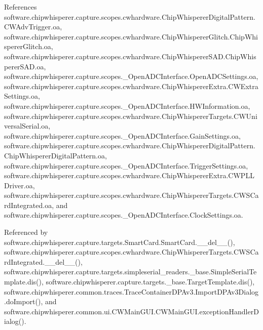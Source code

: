 References software.\+chipwhisperer.\+capture.\+scopes.\+cwhardware.\+Chip\+Whisperer\+Digital\+Pattern.\+C\+W\+Adv\+Trigger.\+oa, software.\+chipwhisperer.\+capture.\+scopes.\+cwhardware.\+Chip\+Whisperer\+Glitch.\+Chip\+Whisperer\+Glitch.\+oa, software.\+chipwhisperer.\+capture.\+scopes.\+cwhardware.\+Chip\+Whisperer\+S\+A\+D.\+Chip\+Whisperer\+S\+A\+D.\+oa, software.\+chipwhisperer.\+capture.\+scopes.\+\_\+\+Open\+A\+D\+C\+Interface.\+Open\+A\+D\+C\+Settings.\+oa, software.\+chipwhisperer.\+capture.\+scopes.\+cwhardware.\+Chip\+Whisperer\+Extra.\+C\+W\+Extra\+Settings.\+oa, software.\+chipwhisperer.\+capture.\+scopes.\+\_\+\+Open\+A\+D\+C\+Interface.\+H\+W\+Information.\+oa, software.\+chipwhisperer.\+capture.\+scopes.\+cwhardware.\+Chip\+Whisperer\+Targets.\+C\+W\+Universal\+Serial.\+oa, software.\+chipwhisperer.\+capture.\+scopes.\+\_\+\+Open\+A\+D\+C\+Interface.\+Gain\+Settings.\+oa, software.\+chipwhisperer.\+capture.\+scopes.\+cwhardware.\+Chip\+Whisperer\+Digital\+Pattern.\+Chip\+Whisperer\+Digital\+Pattern.\+oa, software.\+chipwhisperer.\+capture.\+scopes.\+\_\+\+Open\+A\+D\+C\+Interface.\+Trigger\+Settings.\+oa, software.\+chipwhisperer.\+capture.\+scopes.\+cwhardware.\+Chip\+Whisperer\+Extra.\+C\+W\+P\+L\+L\+Driver.\+oa, software.\+chipwhisperer.\+capture.\+scopes.\+cwhardware.\+Chip\+Whisperer\+Targets.\+C\+W\+S\+Card\+Integrated.\+oa, and software.\+chipwhisperer.\+capture.\+scopes.\+\_\+\+Open\+A\+D\+C\+Interface.\+Clock\+Settings.\+oa.



Referenced by software.\+chipwhisperer.\+capture.\+targets.\+Smart\+Card.\+Smart\+Card.\+\_\+\+\_\+del\+\_\+\+\_\+(), software.\+chipwhisperer.\+capture.\+scopes.\+cwhardware.\+Chip\+Whisperer\+Targets.\+C\+W\+S\+Card\+Integrated.\+\_\+\+\_\+del\+\_\+\+\_\+(), software.\+chipwhisperer.\+capture.\+targets.\+simpleserial\+\_\+readers.\+\_\+base.\+Simple\+Serial\+Template.\+dis(), software.\+chipwhisperer.\+capture.\+targets.\+\_\+base.\+Target\+Template.\+dis(), software.\+chipwhisperer.\+common.\+traces.\+Trace\+Container\+D\+P\+Av3.\+Import\+D\+P\+Av3\+Dialog.\+do\+Import(), and software.\+chipwhisperer.\+common.\+ui.\+C\+W\+Main\+G\+U\+I.\+C\+W\+Main\+G\+U\+I.\+exception\+Handler\+Dialog().


